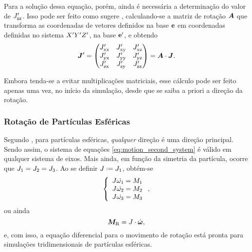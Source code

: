 Para a solução dessa equação, porém, ainda é necessária a determinação do valor de \(J_{\text{zz}}^\prime\). Isso pode ser feito como sugere , calculando-se a matriz de rotação \(\bm{A}\) que transforma as coordenadas de vetores definidos na base \(\mathbf{e}\) em coordenadas definidas no sistema \(X^\prime Y^\prime Z^\prime\), na base \(\mathbf{e}^\prime\), e obtendo
\begin{equation*}
	\bm{J}^\prime =
	\begin{pmatrix}
		J_{\text{xx}}^\prime & J_{\text{xy}}^\prime & J_{\text{xz}}^\prime \\
		J_{\text{yx}}^\prime & J_{\text{yy}}^\prime & J_{\text{yz}}^\prime \\
		J_{\text{zx}}^\prime & J_{\text{zy}}^\prime & J_{\text{zz}}^\prime
	\end{pmatrix}
	=
	\bm{A}\cdot \bm{J}.
\end{equation*}

Embora tenda-se a evitar multiplicações matriciais, esse cálculo pode ser feito apenas uma vez, no início da simulação, desde que se saiba a priori a direção da rotação.

\subsubsection{Rotação de Partículas Esféricas} \label{subsubsec:rotation_of_spherical_particles}

Segundo , para partículas esféricas, \textit{qualquer} direção é uma direção principal. Sendo assim, o sistema de equações \eqref{eq:motion_second_system} é válido em qualquer sistema de eixos. Mais ainda, em função da simetria da partícula, ocorre que \(J_1 = J_2 = J_3\). Ao se definir \(\momentOfInertia \eqdef \momentOfInertia_1\), obtém-se 
\begin{equation*}
	\left\lbrace
	\begin{array}{l}
		\momentOfInertia\deriv{1}{\angularVelocityScalar_1} = \torqueScalar_1 \\
		\momentOfInertia\deriv{1}{\angularVelocityScalar_2} = \torqueScalar_2 \\
		\momentOfInertia\deriv{1}{\angularVelocityScalar_3} = \torqueScalar_3
	\end{array}
	\right.
	,
\end{equation*}
ou ainda
\begin{equation*}
	\resultingTorque = \momentOfInertia\cdot\angularAcceleration,
\end{equation*}
e, com isso, a equação diferencial para o movimento de rotação está pronta para simulações tridimensionais de partículas esféricas.

